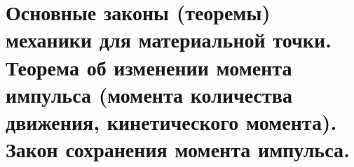 \chapter{Основные законы (теоремы) механики для материальной точки. Теорема об
изменении момента импульса (момента количества движения, кинетического
момента). Закон сохранения момента импульса.}

\newpage %
